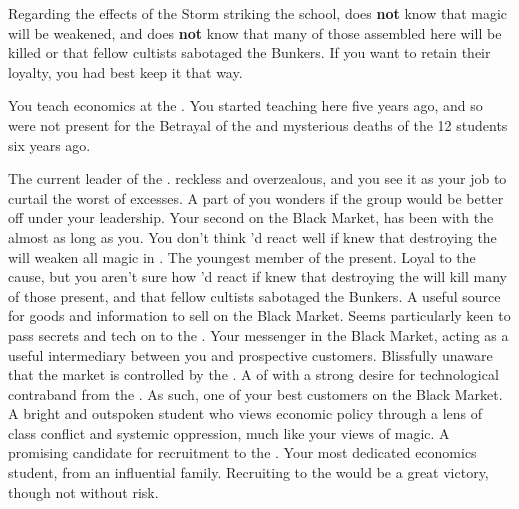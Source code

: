 \documentclass[char]{GL2020}
\begin{document}
\begin{itemz}[Notes]
    \item Regarding the effects of the Storm striking the school, \cChupInventor{} does \textbf{not} know that magic will be weakened, and \cChupStudent{} does \textbf{not} know that many of those assembled here will be killed or that \cChupStudent{\their} fellow cultists sabotaged the Bunkers. If you want to retain their loyalty, you had best keep it that way.
    \item You teach economics at the \pSchool{}. You started teaching here five years ago, and so were not present for the Betrayal of the \pShip{} and mysterious deaths of the 12 students six years ago.
\end{itemz}

\begin{contacts}
    \contact{\cChupLeader{}} The current leader of the \pGoaties{}. \cChupLeader{\Theyare} reckless and overzealous, and you see it as your job to curtail the worst of \cChupLeader{\their} excesses. A part of you wonders if the group would be better off under your leadership.
    \contact{\cChupInventor{}} Your second on the Black Market, \cChupInventor{} has been with the \pGoaties{} almost as long as you. You don't think \cChupInventor{\they}'d react well if  \cChupInventor{\they} knew that destroying the \pSc{} will weaken all magic in \pEarth{}.
    \contact{\cChupStudent{}} The youngest member of the \pGoaties{} present. Loyal to the cause, but you aren't sure how \cChupStudent{\they}'d react if \cChupStudent{\they} knew that destroying the \pSc{} will kill many of those present, and that \cChupStudent{\their} fellow cultists sabotaged the Bunkers.
    \contact{\cEthics{}} A useful source for goods and information to sell on the Black Market. Seems particularly keen to pass secrets and tech on to the \pShip{}.
    \contact{\cLibAssist{}} Your messenger in the Black Market, acting as a useful intermediary between you and prospective customers. Blissfully unaware that the market is controlled by the \pGoaties{}.
    \contact{\cHedonist{}} A \cHedonist{\cleric} of \cFarmGod{\intro} with a strong desire for technological contraband from the \pTech{}. As such, one of your best customers on the Black Market.
    \contact{\cPirateChild{\full}} A bright and outspoken \pShippie{} student who views economic policy through a lens of class conflict and systemic oppression, much like your views of magic. A promising candidate for recruitment to the \pGoaties{}.
     \contact{\cPresident{}} Your most dedicated economics student, from an influential \pShippie{} family. Recruiting \cPresident{\them} to the \pGoaties{} would be a great victory, though not without risk.
\end{contacts}
\end{document}
